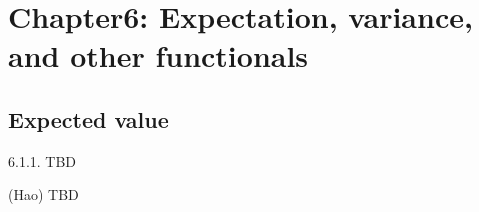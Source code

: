 
\section{Chapter6: Expectation, variance, and other functionals}

\subsection{ Expected value}

\begin{exercise}\label{6.1.1}
6.1.1. TBD
\end{exercise}
\begin{answer} (Hao)
    TBD
\end{answer}